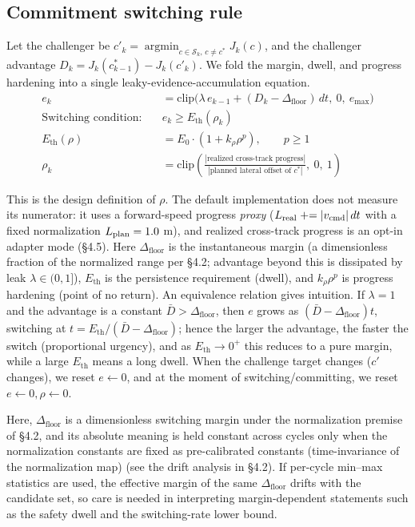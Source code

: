 \documentclass[11pt]{article}
\newcommand{\Dfloor}{\Delta_{\text{floor}}}
\newcommand{\Eth}{E_{\text{th}}}
\begin{document}
\FloatBarrier
\subsection{Commitment switching rule}

Let the challenger be $c'_k = \operatorname*{argmin}_{c \in \mathcal{S}_k,\, c \ne c^*} J_k(c)$, and the challenger advantage $D_k = J_k(c^*_{k-1}) - J_k(c'_k)$. We fold the margin, dwell, and progress hardening into a single leaky-evidence-accumulation equation.
\begin{align}
e_k &= \mathrm{clip}\big(\lambda\, e_{k-1} + (D_k - \Dfloor)\, dt,\ 0,\ e_{\max}\big) \\
\text{Switching condition:}\quad & e_k \ge \Eth(\rho_k) \\
\Eth(\rho) &= E_0 \cdot (1 + k_\rho \rho^p), \qquad p \ge 1 \\
\rho_k &= \mathrm{clip}\!\left(\frac{|\text{realized cross-track progress}|}{|\text{planned lateral offset of } c^*|},\ 0,\ 1\right)
\end{align}

This is the design definition of $\rho$. The default implementation does not measure its numerator: it uses a forward-speed progress \emph{proxy} ($L_{\rm real}\mathrel{+}=|v_{\rm cmd}|\,dt$ with a fixed normalization $L_{\rm plan}=1.0$ m), and realized cross-track progress is an opt-in adapter mode (\S4.5). Here $\Dfloor$ is the instantaneous margin (a dimensionless fraction of the normalized range per \S4.2; advantage beyond this is dissipated by leak $\lambda \in (0,1]$), $\Eth$ is the persistence requirement (dwell), and $k_\rho \rho^p$ is progress hardening (point of no return). An equivalence relation gives intuition. If $\lambda = 1$ and the advantage is a constant $\bar D > \Dfloor$, then $e$ grows as $(\bar D - \Dfloor)t$, switching at $t = \Eth/(\bar D - \Dfloor)$; hence the larger the advantage, the faster the switch (proportional urgency), and as $\Eth \to 0^+$ this reduces to a pure margin, while a large $\Eth$ means a long dwell. When the challenge target changes ($c'$ changes), we reset $e \leftarrow 0$, and at the moment of switching/committing, we reset $e \leftarrow 0, \rho \leftarrow 0$.

Here, $\Dfloor$ is a dimensionless switching margin under the normalization premise of \S4.2, and its absolute meaning is held constant across cycles only when the normalization constants are fixed as pre-calibrated constants (time-invariance of the normalization map) (see the drift analysis in \S4.2). If per-cycle min--max statistics are used, the effective margin of the same $\Dfloor$ drifts with the candidate set, so care is needed in interpreting margin-dependent statements such as the safety dwell and the switching-rate lower bound.
\end{document}
